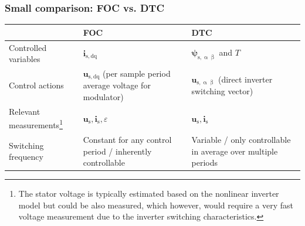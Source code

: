 \begin{frame}
    \frametitle{Small comparison: FOC vs. DTC}
    \begin{table}
        \centering
        \small
        \renewcommand{\arraystretch}{1.3}
        \begin{tabular}{@{}p{3.75cm} P{5cm} P{5cm}}
            \toprule%
                                                                                                                                                                                                                                                                    & \textbf{FOC}                                                             & \textbf{DTC}                                                           \\%
            \midrule%
            Controlled variables                                                                                                                                                                                                                                    & $\bm{i}_\mathrm{s,dq}$                                                   & $\bm{\psi}_\mathrm{s,\upalpha\upbeta}$ and $T$                         \\%
            Control actions                                                                                                                                                                                                                                         & $\bm{u}_\mathrm{s,dq}$ (per sample period average voltage for modulator) & $\bm{u}_\mathrm{s,\upalpha\upbeta}$ (direct inverter switching vector) \\%
            Relevant measurements\footnote{The stator voltage is typically estimated based on the nonlinear inverter model but could be also measured, which however, would require a very fast voltage measurement due to the inverter switching characteristics.} & $\bm{u}_\mathrm{s}, \bm{i}_\mathrm{s}, \varepsilon$                      & $\bm{u}_\mathrm{s}, \bm{i}_\mathrm{s}$                                 \\%
            Switching frequency                                                                                                                                                                                                                                     & Constant for any control period / inherently controllable                & Variable / only controllable in average over multiple periods          \\%

\end{tabular}
\end{table}
\end{frame}
